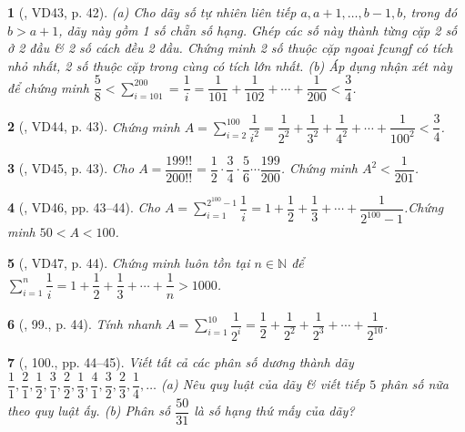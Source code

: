 \documentclass{article}
\newtheorem{baitoan}{}
\begin{document}
\begin{baitoan}[\cite{Binh_Toan_6_tap_2}, VD43, p. 42]
	(a) Cho dãy số tự nhiên liên tiếp $a,a + 1,\ldots,b - 1,b$, trong đó $b > a + 1$, dãy này gồm 1 số chẵn số hạng. Ghép các số này thành từng cặp 2 số ở 2 đầu \& 2 số cách đều 2 đầu. Chứng minh 2 số thuộc cặp ngoai fcungf có tích nhỏ nhất, 2 số thuộc cặp trong cùng có tích lớn nhất. (b) Áp dụng nhận xét này để chứng minh $\dfrac{5}{8} < \sum_{i=101}^{200} = \dfrac{1}{i} = \dfrac{1}{101} + \dfrac{1}{102} + \cdots + \dfrac{1}{200} < \dfrac{3}{4}$.
\end{baitoan}

\begin{baitoan}[\cite{Binh_Toan_6_tap_2}, VD44, p. 43]
	Chứng minh $A = \sum_{i=2}^{100} \dfrac{1}{i^2} = \dfrac{1}{2^2} + \dfrac{1}{3^2} + \dfrac{1}{4^2} + \cdots + \dfrac{1}{100^2} < \dfrac{3}{4}$.
\end{baitoan}

\begin{baitoan}[\cite{Binh_Toan_6_tap_2}, VD45, p. 43]
	Cho $A = \dfrac{199!!}{200!!} = \dfrac{1}{2}\cdot\dfrac{3}{4}\cdot\dfrac{5}{6}\cdots\dfrac{199}{200}$. Chứng minh $A^2 < \dfrac{1}{201}$.
\end{baitoan}

\begin{baitoan}[\cite{Binh_Toan_6_tap_2}, VD46, pp. 43--44]
	Cho $A = \sum_{i=1}^{2^{100} - 1} \dfrac{1}{i} = 1 + \dfrac{1}{2} + \dfrac{1}{3} + \cdots + \dfrac{1}{2^{100} - 1}$.Chứng minh $50 < A < 100$.
\end{baitoan}

\begin{baitoan}[\cite{Binh_Toan_6_tap_2}, VD47, p. 44]
	Chứng minh luôn tồn tại $n\in\mathbb{N}$ để $\sum_{i=1}^n \dfrac{1}{i} = 1 + \dfrac{1}{2} + \dfrac{1}{3} + \cdots + \dfrac{1}{n} > 1000$.
\end{baitoan}

\begin{baitoan}[\cite{Binh_Toan_6_tap_2}, 99., p. 44]
	Tính nhanh $A = \sum_{i=1}^{10} \dfrac{1}{2^i} = \dfrac{1}{2} + \dfrac{1}{2^2} + \dfrac{1}{2^3} + \cdots + \dfrac{1}{2^10}$.
\end{baitoan}

\begin{baitoan}[\cite{Binh_Toan_6_tap_2}, 100., pp. 44--45]
	Viết tất cả các phân số dương thành dãy $\dfrac{1}{1},\dfrac{2}{1},\dfrac{1}{2},\dfrac{3}{1},\dfrac{2}{2},\dfrac{1}{3},\dfrac{4}{1},\dfrac{3}{2},\dfrac{2}{3},\dfrac{1}{4},\ldots$ (a) Nêu quy luật của dãy \& viết tiếp $5$ phân số nữa theo quy luật ấy. (b) Phân số $\dfrac{50}{31}$ là số hạng thứ mấy của dãy?
\end{baitoan}
\end{document}
